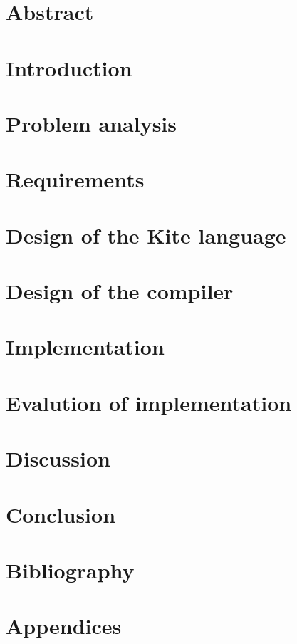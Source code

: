 \documentclass{article}
\begin{document}

\clearpage

\section*{Abstract}

\clearpage

\tableofcontents
\clearpage

\section{Introduction}

\clearpage

\section{Problem analysis}

\clearpage

\section{Requirements}

\clearpage

\section{Design of the Kite language}

\clearpage

\section{Design of the compiler}

\clearpage

\section{Implementation}

\clearpage

\section{Evalution of implementation}

\clearpage

\section{Discussion}

\clearpage

\section{Conclusion}

\clearpage

\section{Bibliography}

\clearpage

\section{Appendices}

\end{document}
